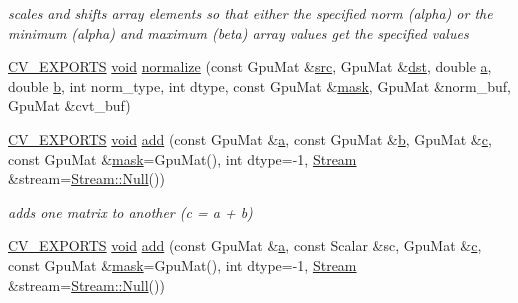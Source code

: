 \begin{DoxyCompactItemize}
\begin{DoxyCompactList}\small\item\em scales and shifts array elements so that either the specified norm (alpha) or the minimum (alpha) and maximum (beta) array values get the specified values \end{DoxyCompactList}\item 
\hyperlink{core_2types__c_8h_a1bf9f0e121b54272da02379cfccd0a2b}{C\-V\-\_\-\-E\-X\-P\-O\-R\-T\-S} \hyperlink{legacy_8hpp_a8bb47f092d473522721002c86c13b94e}{void} \hyperlink{namespacecv_1_1gpu_a2e92e66251456d5a1f43564ca520d4de}{normalize} (const Gpu\-Mat \&\hyperlink{legacy_8hpp_a371cd109b74033bc4366f584edd3dacc}{src}, Gpu\-Mat \&\hyperlink{photo__c_8h_aed13e2a25279b24dc954073233fef7a5}{dst}, double \hyperlink{legacy_8hpp_a1031d0e0a97a340abfe0a6ab9e831045}{a}, double \hyperlink{legacy_8hpp_ac04272e8ca865b8fba18d36edae9fd2a}{b}, int norm\-\_\-type, int dtype, const Gpu\-Mat \&\hyperlink{tracking_8hpp_a6b13ecd2fd6ec7ad422f1d7863c3ad19}{mask}, Gpu\-Mat \&norm\-\_\-buf, Gpu\-Mat \&cvt\-\_\-buf)
\item 
\hyperlink{core_2types__c_8h_a1bf9f0e121b54272da02379cfccd0a2b}{C\-V\-\_\-\-E\-X\-P\-O\-R\-T\-S} \hyperlink{legacy_8hpp_a8bb47f092d473522721002c86c13b94e}{void} \hyperlink{namespacecv_1_1gpu_ad04bf54d4fe4ef08ab013d3054c0322b}{add} (const Gpu\-Mat \&\hyperlink{legacy_8hpp_a1031d0e0a97a340abfe0a6ab9e831045}{a}, const Gpu\-Mat \&\hyperlink{legacy_8hpp_ac04272e8ca865b8fba18d36edae9fd2a}{b}, Gpu\-Mat \&\hyperlink{legacy_8hpp_a1971420173e06f45845eed2ab4e3d5d0}{c}, const Gpu\-Mat \&\hyperlink{tracking_8hpp_a6b13ecd2fd6ec7ad422f1d7863c3ad19}{mask}=Gpu\-Mat(), int dtype=-\/1, \hyperlink{classcv_1_1gpu_1_1Stream}{Stream} \&stream=\hyperlink{classcv_1_1gpu_1_1Stream_af96c23564834f88333dcb8997df553f1}{Stream\-::\-Null}())
\begin{DoxyCompactList}\small\item\em adds one matrix to another (c = a + b) \end{DoxyCompactList}\item 
\hyperlink{core_2types__c_8h_a1bf9f0e121b54272da02379cfccd0a2b}{C\-V\-\_\-\-E\-X\-P\-O\-R\-T\-S} \hyperlink{legacy_8hpp_a8bb47f092d473522721002c86c13b94e}{void} \hyperlink{namespacecv_1_1gpu_a7f58859c366adb1f864861dd2d0c6393}{add} (const Gpu\-Mat \&\hyperlink{legacy_8hpp_a1031d0e0a97a340abfe0a6ab9e831045}{a}, const Scalar \&sc, Gpu\-Mat \&\hyperlink{legacy_8hpp_a1971420173e06f45845eed2ab4e3d5d0}{c}, const Gpu\-Mat \&\hyperlink{tracking_8hpp_a6b13ecd2fd6ec7ad422f1d7863c3ad19}{mask}=Gpu\-Mat(), int dtype=-\/1, \hyperlink{classcv_1_1gpu_1_1Stream}{Stream} \&stream=\hyperlink{classcv_1_1gpu_1_1Stream_af96c23564834f88333dcb8997df553f1}{Stream\-::\-Null}())

\end{DoxyCompactItemize}
